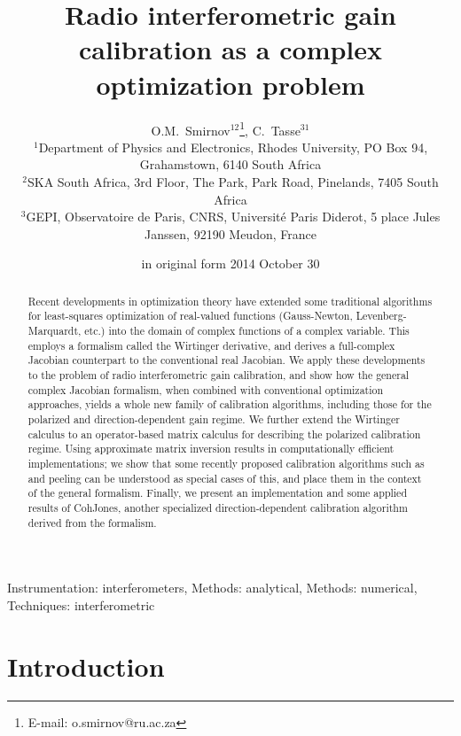 \documentclass[useAMS,usenatbib]{mn2e}
\title[Radio interferometric gain calibration as a complex optimization problem]{Radio interferometric gain calibration as a complex optimization problem}
\author[O.M.~Smirnov \& C.~Tasse]{O.M.~Smirnov$^{12}$\thanks{E-mail: o.smirnov@ru.ac.za}, C.~Tasse$^{31}$\\
$^1$Department of Physics and Electronics, Rhodes University, PO Box 94, Grahamstown, 6140 South Africa\\
$^2$SKA South Africa, 3rd Floor, The Park, Park Road, Pinelands, 7405 South Africa\\
$^3$GEPI, Observatoire de Paris, CNRS, Universit\'e Paris Diderot,
5 place Jules Janssen, 92190 Meudon, France}
\newcommand{\StefCal}{{\sc StefCal}}
\numberwithin{equation}{section}
\begin{document}
\date{in original form 2014 October 30}

\pagerange{\pageref{firstpage}--\pageref{lastpage}} 

\maketitle

\label{firstpage}

\begin{abstract}
Recent developments in optimization theory have extended some traditional algorithms for least-squares optimization of 
real-valued functions (Gauss-Newton, Levenberg-Marquardt, etc.) into the domain of complex functions of a complex 
variable. This employs a formalism called the Wirtinger derivative, and derives a full-complex Jacobian counterpart 
to the conventional real Jacobian. We apply these developments to the problem of radio interferometric gain 
calibration, and show how the general complex Jacobian formalism, when combined with conventional optimization 
approaches, yields a whole new family of calibration algorithms, including those for the polarized and 
direction-dependent gain regime. We further extend the Wirtinger calculus to an operator-based matrix calculus 
for describing the polarized calibration regime. Using approximate matrix 
inversion results in computationally efficient implementations; we show that some recently proposed calibration algorithms 
such as {\sc \StefCal} and peeling can be understood as special cases of this, and place them in the context of the general 
formalism. Finally, we present an implementation and some applied results of {\sc CohJones}, another specialized 
direction-dependent calibration algorithm derived from the formalism.

\end{abstract}

\begin{keywords}
Instrumentation: interferometers, Methods: analytical, Methods: numerical, Techniques: interferometric
\end{keywords}

\section*{Introduction}
\end{document}
